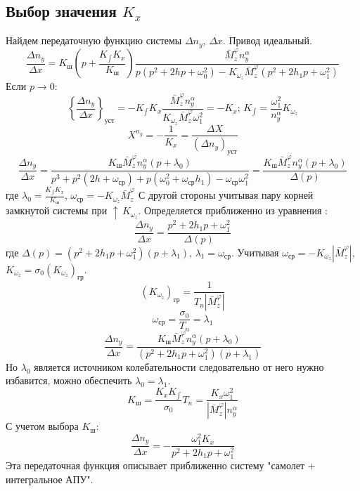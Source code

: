 \documentclass{article}
\begin{document}
\subsection{Выбор значения $K_x$}
Найдем передаточную функцию системы $\Delta n_y$, $\Delta x$. Привод идеальный.
\begin{equation}
    \frac{\Delta n_y}{\Delta x} = K_\text{ш} (p + \frac{K_{\int} K_x}{K_\text{ш}}) \frac{\bar{M}_z^{\varphi} n_y^\alpha}{p(p^2 +  2 h p + \omega_0^2) - K_{\omega_z} \bar{M}_z^{\varphi} (p^2 + 2h_{1}p + \omega_1^2)}
\end{equation}
Если $p \rightarrow 0$:
\[
	\left\{ \frac{\Delta n_y}{\Delta x} \right\}_\text{уст}  = -K_{\int}K_x \frac{\bar{M}_z^{\varphi} n_y^\alpha}{K_{\omega_z} \bar{M}_z^{\varphi} \omega_1^2} = -K_x; \, K_{\int} = \frac{\omega_1^2}{n_y^\alpha} K_{\omega_z}
\]
\[
	X^{n_y} = - \frac{1}{K_x} = \frac{\Delta X}{(\Delta n_y)_\text{уст}}
\]
\[
	\frac{\Delta n_y}{\Delta x} = \frac{K_\text{ш} \bar{M}_z^\varphi n_y^\alpha(p + \lambda_0)}{p^3 + p^2 (2h+\omega_\text{ср}) + p (\omega_0^2 + \omega_\text{ср} h_1) - \omega_\text{ср} \omega_1^2} = \frac{K_\text{ш} \bar{M}_z^\varphi n_y^\alpha(p + \lambda_0)}{\Delta(p)}
\]
где $\lambda_0 = \frac{K_{\int} K_x}{K_\text{ш}}$, $\omega_\text{ср} = -K_{\omega_z}\bar{M}_z^\varphi$
С другой стороны учитывая пару корней замкнутой системы при $\uparrow \, K_{\omega_z}$. Определяется приближенно из уравнения :
\[
	\frac{\Delta n_y}{\Delta x} = \frac{p^2 + 2 h_1 p + \omega_1^2}{\Delta(p)}
\]
где $\Delta(p) = (p^2 + 2 h_1 p + \omega_1^2)(p + \lambda_1)$, $\lambda_1 = \omega_\text{ср}$. Учитывая $\omega_\text{ср} = - K_{\omega_z} |\bar{M}_z^\varphi|$, $K_{\omega_z} = \sigma_0 (K_{\omega_z})_\text{гр}$.\\
\[
	(K_{\omega_z})_\text{гр} = \frac{1}{T_n |\bar{M}_z^\varphi|}
\]
\[
	\omega_\text{ср} = \frac{\sigma_0}{T_n} = \lambda_1
\]
\[
	\frac{\Delta n_y}{\Delta x} = \frac{K_\text{ш} \bar{M}_z^\varphi n_y^\alpha(p + \lambda_0)}{(p^2 + 2h_{1} p + \omega_1^2)(p+\lambda_1)}
\]
Но $\lambda_0$ является источником колебательности следовательно от него нужно избавится, можно обеспечить $\lambda_0 = \lambda_1$.
\[
	K_\text{ш} = \frac{K_{x} K_{\int}}{\sigma_0} T_n = \frac{K_x \omega_1^2}{|\bar{M}_z^\varphi| n_y^\alpha}
\]
С учетом выбора $K_\text{ш}$:
\begin{equation}
	\frac{\Delta n_y}{\Delta x} = -\frac{\omega_1^2 K_x}{p^2 + 2 h_1 p + \omega_1 ^2}
\end{equation}
Эта передаточная функция описывает приближенно систему "самолет + интегральное АПУ".
\end{document}
